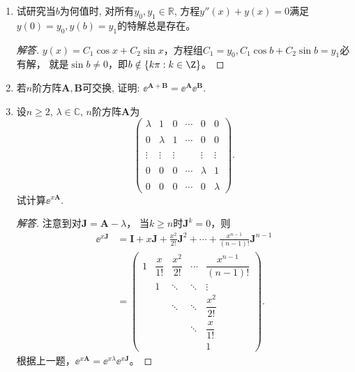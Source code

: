 \begin{3a}
\begin{enumerate}
\item 试研究当\(b\)为何值时, 对所有\(y_0,y_1\in\mathbb{R}\), 
方程$y''(x)+y(x)=0$满足\(y(0)=y_0,y(b)=y_1\)的特解总是存在。
\begin{proof}[解答]
    $y(x)=C_1\cos x+C_2\sin x$，方程组$C_1=y_0,C_1\cos b+C_2\sin b=y_1$必有解，
    就是$\sin b\ne0$，即$b\notin\{k\pi:k\in\Z\}$。
\end{proof}

\item 若\(n\)阶方阵\(\boldsymbol{A},\boldsymbol{B}\)可交换, 
证明: \(\ee^{\boldsymbol{A}+\boldsymbol{B}}
=\ee^{\boldsymbol{A}}\ee^{\boldsymbol{B}}\).

\item 设\(n\geqslant 2\), \(\lambda\in\mathbb{C}\), \(n\)阶方阵\(\boldsymbol{A}\)为
\[\begin{pmatrix}
\lambda&1&0&\cdots&0&0\\ \\
0&\lambda&1&\cdots&0&0\\ \\
\vdots&\vdots&\vdots&&\vdots&\vdots\\ \\
0&0&0&\cdots&\lambda&1\\ \\
0&0&0&\cdots&0&\lambda
\end{pmatrix}.\]试计算\(\ee^{x\boldsymbol{A}}\).
\begin{proof}[解答]
    注意到对\(\boldsymbol{J}=\boldsymbol{A}-\lambda\)，
    当\(k \geqslant n\)时\(\boldsymbol{J}^k=0\)，则
    \begin{align*}
    \ee^{x\boldsymbol{J}}&=\boldsymbol{I}+x\boldsymbol{J}
    +\frac{x^2}{2!}\boldsymbol{J}^2+\cdots
    +\frac{x^{n-1}}{(n-1)!}\boldsymbol{J}^{n-1}\\
    &=\begin{pmatrix}
        1&\dfrac{x}{1!}&\dfrac{x^2}{2!}&\cdots&\dfrac{x^{n-1}}{(n-1)!}\\
        &1&\ddots&\ddots&\vdots\\
        & &\ddots&\ddots&\dfrac{x^2}{2!}\\
        & & &\ddots&\dfrac{x}{1!}\\
        & & & &1
    \end{pmatrix}.\end{align*}
    根据上一题，$\ee^{x\boldsymbol{A}}=\ee^{x\lambda}\ee^{x\boldsymbol{J}}$。
\end{proof}
\end{enumerate}
\end{3a}

